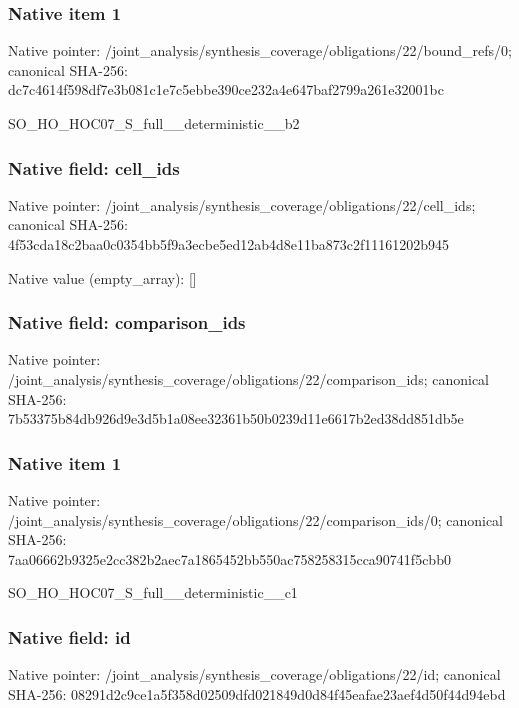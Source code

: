 \documentclass[10pt,a4paper]{article}
\begin{document}
\subsubsection{Native item 1}
Native pointer: /joint\_\allowbreak{}analysis/synthesis\_\allowbreak{}coverage/obligations/22/bound\_\allowbreak{}refs/0; canonical SHA-256: dc7c4614f598df7e3b081c1e7c5ebbe390ce232a4e647baf2799a261e32001bc

\begingroup\raggedright\sloppy SO\_\allowbreak{}HO\_\allowbreak{}HOC07\_\allowbreak{}S\_\allowbreak{}full\_\allowbreak{}\_\allowbreak{}deterministic\_\allowbreak{}\_\allowbreak{}b2\par\endgroup

\subsubsection{Native field: cell\_\allowbreak{}ids}
Native pointer: /joint\_\allowbreak{}analysis/synthesis\_\allowbreak{}coverage/obligations/22/cell\_\allowbreak{}ids; canonical SHA-256: 4f53cda18c2baa0c0354bb5f9a3ecbe5ed12ab4d8e11ba873c2f11161202b945

Native value (empty\_\allowbreak{}array): []

\subsubsection{Native field: comparison\_\allowbreak{}ids}
Native pointer: /joint\_\allowbreak{}analysis/synthesis\_\allowbreak{}coverage/obligations/22/comparison\_\allowbreak{}ids; canonical SHA-256: 7b53375b84db926d9e3d5b1a08ee32361b50b0239d11e6617b2ed38dd851db5e

\subsubsection{Native item 1}
Native pointer: /joint\_\allowbreak{}analysis/synthesis\_\allowbreak{}coverage/obligations/22/comparison\_\allowbreak{}ids/0; canonical SHA-256: 7aa06662b9325e2cc382b2aec7a1865452bb550ac758258315cca90741f5cbb0

\begingroup\raggedright\sloppy SO\_\allowbreak{}HO\_\allowbreak{}HOC07\_\allowbreak{}S\_\allowbreak{}full\_\allowbreak{}\_\allowbreak{}deterministic\_\allowbreak{}\_\allowbreak{}c1\par\endgroup

\subsubsection{Native field: id}
Native pointer: /joint\_\allowbreak{}analysis/synthesis\_\allowbreak{}coverage/obligations/22/id; canonical SHA-256: 08291d2c9ce1a5f358d02509dfd021849d0d84f45eafae23aef4d50f44d94ebd
\end{document}
